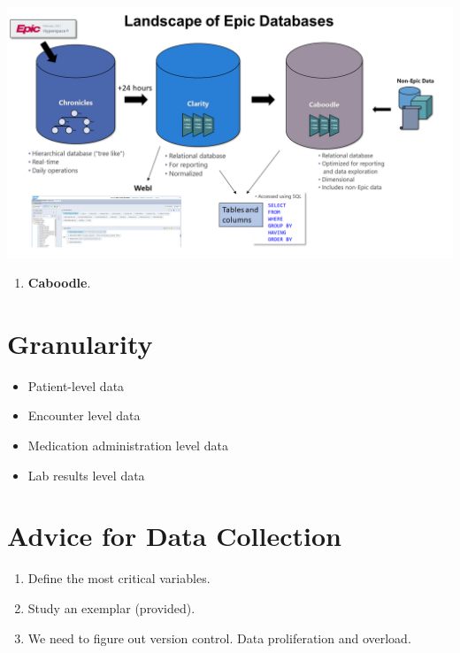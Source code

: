 \documentclass[
]{report}
\providecommand{\tightlist}{%
  \setlength{\itemsep}{0pt}\setlength{\parskip}{0pt}}
\begin{document}
\includegraphics{EpicDataLandscape.png}

\begin{enumerate}
\def\labelenumi{\arabic{enumi}.}
\setcounter{enumi}{2}
\tightlist
\item
  \textbf{Caboodle}.
\end{enumerate}

\hypertarget{granularity}{%
\section{Granularity}\label{granularity}}

\begin{itemize}
\tightlist
\item
  Patient-level data
\item
  Encounter level data
\item
  Medication administration level data
\item
  Lab results level data
\end{itemize}

\hypertarget{advice-for-data-collection}{%
\section{Advice for Data Collection}\label{advice-for-data-collection}}

\begin{enumerate}
\def\labelenumi{\arabic{enumi}.}
\item
  Define the most critical variables.
\item
  Study an exemplar (provided).
\item
  We need to figure out version control. Data proliferation and
  overload.
\end{enumerate}
\end{document}
